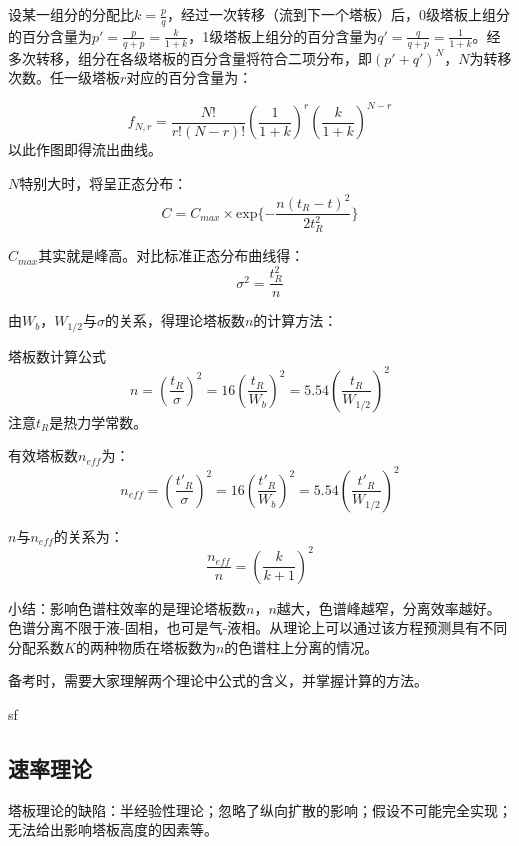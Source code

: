 设某一组分的分配比$k=\frac{p}{q}$，经过一次转移（流到下一个塔板）后，0级塔板上组分的百分含量为$p'=\frac{p}{q+p}=\frac{k}{1+k}$，1级塔板上组分的百分含量为$q'=\frac{q}{q+p}=\frac{1}{1+k}$。经多次转移，组分在各级塔板的百分含量将符合二项分布，即${(p'+q')^N}$，$N$为转移次数。任一级塔板$r$对应的百分含量为：

\begin{equation*}
	f_{N,r}=\dfrac{N!}{r!(N-r)!} {(\dfrac{1}{1+k})}^r {(\dfrac{k}{1+k})}^{N-r}
\end{equation*}
以此作图即得流出曲线。

$N$特别大时，将呈正态分布：
\begin{equation*}
	C=C_{max}\times \mathrm{exp}\{-\dfrac{n(t_R-t)^2}{2t_R^2}\}
\end{equation*}

$C_{max}$其实就是峰高。对比标准正态分布曲线得：
\begin{equation*}
	{\sigma}^2=\dfrac{t_R^2}{n}
\end{equation*}

由$W_b$，$W_{1/2}$与$\sigma$的关系，得理论塔板数$n$的计算方法：

\begin{theorem*}{塔板数计算公式}{}
	\begin{equation*}
	n={\left(\dfrac{t_R}{\sigma}\right)}^2=16{\left(\dfrac{t_R}{W_b}\right)}^2=5.54{\left(\dfrac{t_R}{W_{1/2}}\right)}^2
	\end{equation*}
	注意$t_R$是热力学常数。
	
	有效塔板数$n_{eff}$为：
	\begin{equation*}
	n_{eff}={\left(\dfrac{t'_R}{\sigma}\right)}^2=16{\left(\dfrac{t'_R}{W_b}\right)}^2=5.54{\left(\dfrac{t'_R}{W_{1/2}}\right)}^2
	\end{equation*}
	
	$n$与$n_{eff}$的关系为：$$\dfrac{n_{eff}}{n}={\left(\dfrac{k}{k+1}\right)}^2$$
\end{theorem*}

小结：影响色谱柱效率的是理论塔板数$n$，$n$越大，色谱峰越窄，分离效率越好。色谱分离不限于液-固相，也可是气-液相。从理论上可以通过该方程预测具有不同分配系数$K$的两种物质在塔板数为$n$的色谱柱上分离的情况。

备考时，需要大家理解两个理论中公式的含义，并掌握计算的方法。
\begin{example}
	sf
\end{example}


\subsection{速率理论}
塔板理论的缺陷：半经验性理论；忽略了纵向扩散的影响；假设不可能完全实现；无法给出影响塔板高度的因素等。

